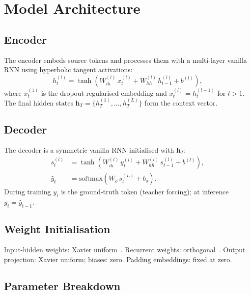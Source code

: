 \documentclass[runningheads]{llncs}
\begin{document}
\section{Model Architecture}
\label{sec:model}

\subsection{Encoder}

The encoder embeds source tokens and processes them with a multi-layer vanilla
RNN using hyperbolic tangent activations:
\begin{equation}
  h_t^{(l)} = \tanh\!\left(W_{ih}^{(l)}\,x_t^{(l)}
  + W_{hh}^{(l)}\,h_{t-1}^{(l)} + b^{(l)}\right),
  \label{eq:rnn_enc}
\end{equation}
where $x_t^{(1)}$ is the dropout-regularised embedding and
$x_t^{(l)}{=}h_t^{(l-1)}$ for $l{>}1$. The final hidden states
$\mathbf{h}_T{=}\{h_T^{(1)},\ldots,h_T^{(L)}\}$ form the context vector.

\subsection{Decoder}

The decoder is a symmetric vanilla RNN initialised with $\mathbf{h}_T$:
\begin{align}
  s_t^{(l)} &= \tanh\!\left(W_{ih}^{(l)}\,y_t^{(l)}
  + W_{hh}^{(l)}\,s_{t-1}^{(l)} + b^{(l)}\right), \\
  \hat{y}_t &= \mathrm{softmax}\!\left(W_o\,s_t^{(L)} + b_o\right).
\end{align}
During training $y_t$ is the ground-truth token (teacher forcing); at
inference $y_t{=}\hat{y}_{t-1}$.

\subsection{Weight Initialisation}

Input-hidden weights: Xavier uniform~\cite{glorot2010}.
Recurrent weights: orthogonal~\cite{saxe2014}.
Output projection: Xavier uniform; biases: zero.
Padding embeddings: fixed at zero.

\subsection{Parameter Breakdown}
\end{document}
